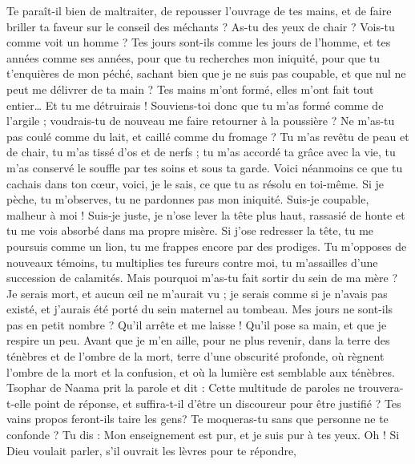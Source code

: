 \begin{multicols}{2}
Te paraît-il bien de maltraiter, de repousser l'ouvrage de tes mains, et de faire briller ta faveur sur le conseil des méchants ?
As-tu des yeux de chair ? Vois-tu comme voit un homme ?
Tes jours sont-ils comme les jours de l'homme, et tes années comme ses années,
pour que tu recherches mon iniquité, pour que tu t'enquières de mon péché,
sachant bien que je ne suis pas coupable, et que nul ne peut me délivrer de ta main ?
Tes mains m'ont formé, elles m'ont fait tout entier… Et tu me détruirais !
Souviens-toi donc que tu m'as formé comme de l'argile ; voudrais-tu de nouveau me faire retourner à la poussière ?
Ne m'as-tu pas coulé comme du lait, et caillé comme du fromage ?
Tu m'as revêtu de peau et de chair, tu m'as tissé d'os et de nerfs ;
tu m'as accordé ta grâce avec la vie, tu m'as conservé le souffle par tes soins et sous ta garde.
Voici néanmoins ce que tu cachais dans ton cœur, voici, je le sais, ce que tu as résolu en toi-même.
Si je pèche, tu m'observes, tu ne pardonnes pas mon iniquité.
Suis-je coupable, malheur à moi ! Suis-je juste, je n'ose lever la tête plus haut, rassasié de honte et tu me vois absorbé dans ma propre misère.
Si j'ose redresser la tête, tu me poursuis comme un lion, tu me frappes encore par des prodiges.
Tu m'opposes de nouveaux témoins, tu multiplies tes fureurs contre moi, tu m'assailles d'une succession de calamités.
Mais pourquoi m'as-tu fait sortir du sein de ma mère ? Je serais mort, et aucun œil ne m'aurait vu ;
je serais comme si je n'avais pas existé, et j'aurais été porté du sein maternel au tombeau.
Mes jours ne sont-ils pas en petit nombre ? Qu'il arrête et me laisse ! Qu'il pose sa main, et que je respire un peu.
Avant que je m'en aille, pour ne plus revenir, dans la terre des ténèbres et de l'ombre de la mort,
terre d'une obscurité profonde, où règnent l'ombre de la mort et la confusion, et où la lumière est semblable aux ténèbres.
\VerseOne{}Tsophar de Naama prit la parole et dit :
Cette multitude de paroles ne trouvera-t-elle point de réponse, et suffira-t-il d'être un discoureur pour être justifié ?
Tes vains propos feront-ils taire les gens? Te moqueras-tu sans que personne ne te confonde ?
Tu dis : Mon enseignement est pur, et je suis pur à tes yeux.
Oh ! Si Dieu voulait parler, s'il ouvrait les lèvres pour te répondre,

\end{multicols}
